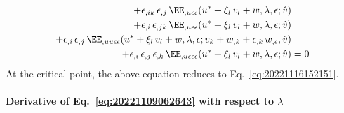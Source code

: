 \begin{equation}
\begin{aligned}[b]
    + \epsilon_{,ik} \, \epsilon_{,j} \, \EE_{,u\epsilon\epsilon}(u^\ast + \xi_l \, v_l + w, \lambda, \epsilon; \hat{v}) &\\
    + \epsilon_{,i} \, \epsilon_{,jk} \, \EE_{,u\epsilon\epsilon}(u^\ast + \xi_l \, v_l + w, \lambda, \epsilon; \hat{v}) &\\
    + \epsilon_{,i} \, \epsilon_{,j} \, \EE_{,uu\epsilon\epsilon}(u^\ast + \xi_l \, v_l + w, \lambda, \epsilon;  v_k + w_{,k} + \epsilon_{,k} \, w_{,\epsilon}, \hat{v}) &\\
    + \epsilon_{,i} \, \epsilon_{,j} \, \epsilon_{,k} \, \EE_{,u\epsilon\epsilon\epsilon}(u^\ast + \xi_l \, v_l + w, \lambda, \epsilon; \hat{v}) &= 0
  \end{aligned}
\end{equation}
At the critical point, the above equation reduces to Eq.~\eqref{eq:20221116152151}.

\paragraph{Derivative of Eq.~\eqref{eq:20221109062643} with respect to \(\lambda\)}

